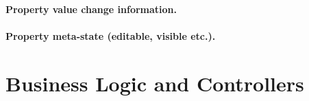   \paragraph*{Property value change information.}
  \paragraph*{Property meta-state (editable, visible etc.).}

\section{Business Logic and Controllers}

% 
% 
% 
% 
